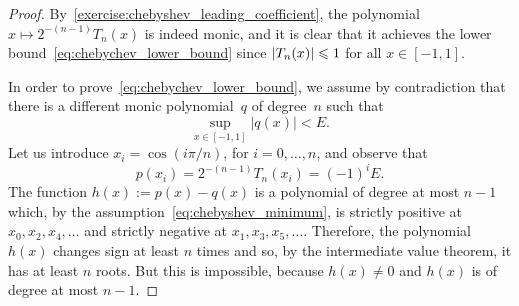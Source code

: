 \begin{proof}
    By~\cref{exercise:chebyshev_leading_coefficient},
    the polynomial $x \mapsto 2^{-(n-1)} T_n(x)$ is indeed monic,
    and it is clear that it achieves the lower bound~\eqref{eq:chebychev_lower_bound}
    since $\lvert T_n(x)\rvert \leqslant 1$ for all $x \in [-1, 1]$.

    In order to prove~\eqref{eq:chebychev_lower_bound},
    we assume by contradiction that there is a different monic polynomial~$q$ of degree~$n$ such that
    \begin{equation}
        \label{eq:chebyshev_minimum}
        \sup_{x \in [-1, 1]} \bigl\lvert q(x) \bigr\rvert < E.
    \end{equation}
    Let us introduce $x_i = \cos(i \pi/n)$, for $i = 0, \dotsc, n$,
    and observe that
    \[
        p(x_i) = 2^{-(n-1)} T_n(x_i) = (-1)^i E.
    \]
    The function $h(x) := p(x) - q(x)$ is a polynomial of degree at most $n-1$ which,
    by the assumption~\eqref{eq:chebyshev_minimum},
    is strictly positive at $x_0, x_2, x_4, \dotsc$ and strictly negative at $x_1, x_3, x_5, \dotsc$.
    Therefore, the polynomial $h(x)$ changes sign at least $n$ times and so,
    by the intermediate value theorem, it has at least $n$ roots.
    But this is impossible, because $h(x) \neq 0$ and $h(x)$ is of degree at most $n-1$.
\end{proof}
